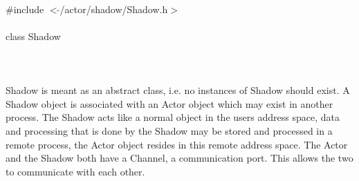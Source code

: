 
   \\
\indent \#include $<\tilde{ }$/actor/shadow/Shadow.h$>$  \\

  \\
\indent class Shadow \\

 \\
 \\

  \\
\indent Shadow is meant as an abstract class, i.e. no instances of Shadow
should exist. A Shadow object is associated with an Actor object which
may exist in another process. The Shadow acts like a normal object in
the users address space, data and processing that is done by the
Shadow may be stored and processed in a remote process, the Actor object
resides in this remote address space. The Actor and the Shadow both
have a Channel, a communication port. This allows the two to
communicate with each other.\\ 

